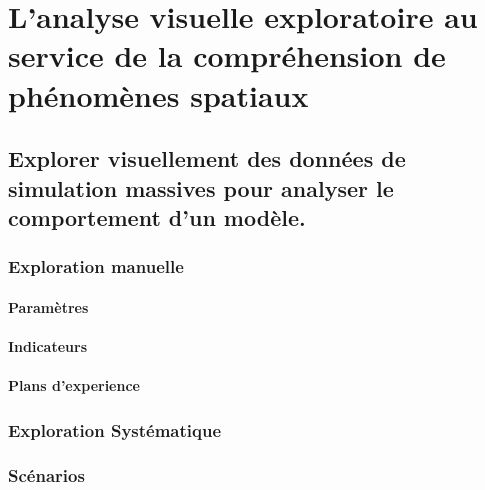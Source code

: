 \documentclass{memoir}
\begin{document}
 
\setcounter{part}{1} 
\setcounter{chapter}{3} 
 
\part{L'analyse visuelle exploratoire au service de la compréhension de phénomènes spatiaux} 
 
\chapter{Explorer visuellement des données de simulation massives pour analyser le comportement d'un modèle.} 
 
\section{Exploration manuelle} 
 
\subsection{Paramètres} 
 
\subsection{Indicateurs} 
 
\subsection{Plans d'experience} 
 
\section{Exploration Systématique} 
 
\section{Scénarios} 
 
\end{document}
